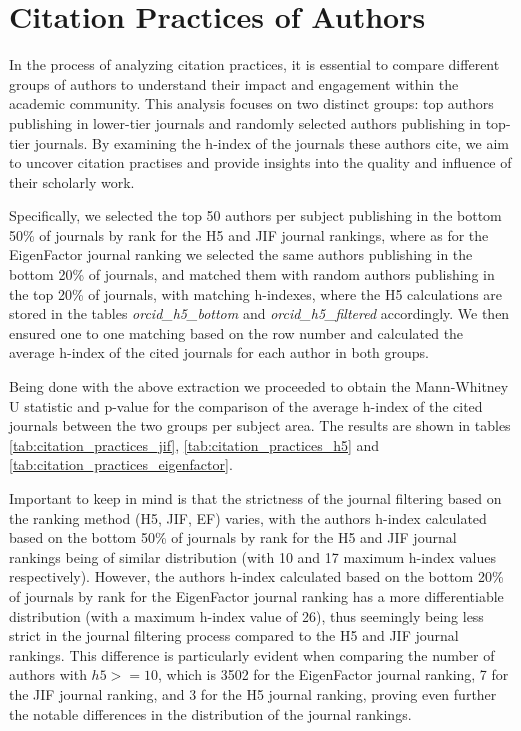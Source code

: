 \section{Citation Practices of Authors}

In the process of analyzing citation practices, it is essential to compare
different groups of authors to understand their impact and engagement within
the academic community. This analysis focuses on two distinct groups: top
authors publishing in lower-tier journals and randomly selected authors
publishing in top-tier journals. By examining the h-index of the journals these
authors cite, we aim to uncover citation practises and provide insights into
the quality and influence of their scholarly work.

Specifically, we selected the top 50 authors per subject publishing in the
bottom 50\% of journals by rank for the H5 and JIF journal rankings, where as
for the EigenFactor journal ranking we selected the same authors publishing in
the bottom 20\% of journals, and matched them with random authors publishing in
the top 20\% of journals, with matching h-indexes, where the H5 calculations
are stored in the tables \emph{orcid\_h5\_bottom} and
\emph{orcid\_h5\_filtered} accordingly. We then ensured one to one matching
based on the row number and calculated the average h-index of the cited
journals for each author in both groups.

Being done with the above extraction we proceeded to obtain the Mann-Whitney U
statistic and p-value for the comparison of the average h-index of the cited
journals between the two groups per subject area. The results are shown in
tables \ref{tab:citation_practices_jif}, \ref{tab:citation_practices_h5} and
\ref{tab:citation_practices_eigenfactor}.

Important to keep in mind is that the strictness of the journal filtering based
on the ranking method (H5, JIF, EF) varies, with the authors h-index calculated
based on the bottom 50\% of journals by rank for the H5 and JIF journal
rankings being of similar distribution (with 10 and 17 maximum h-index values
respectively). However, the authors h-index calculated based on the bottom 20\%
of journals by rank for the EigenFactor journal ranking has a more
differentiable distribution (with a maximum h-index value of 26), thus
seemingly being less strict in the journal filtering process compared to the H5
and JIF journal rankings. This difference is particularly evident when
comparing the number of authors with $h5 >= 10$, which is 3502 for the
EigenFactor journal ranking, 7 for the JIF journal ranking, and 3 for the H5
journal ranking, proving even further the notable differences in the
distribution of the journal rankings.

